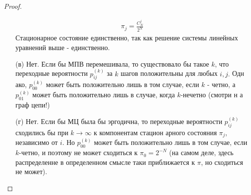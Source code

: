 \begin{proof}
\begin{itemize}
\begin{gather*}
            \pi_{j}=\frac{C_{N}^{j}}{2^{N}}
        \end{gather*}
        Стационарное состояние единственно, так как решение системы линейных уравнений выше - единственно.
    \item[(в)]
        Нет. Если бы МПВ перемешивала, то существовало бы такое $k$, что переходные вероятности $p_{i j}^{(k)}$ за $k$ шагов положительны для любых $i, j .$ Одн ако, $p_{00}^{(k)}$ может быть положительно лишь в том случае, если $k$ - четно, а $p_{01}^{(k)}$ может быть положительно лишь в случае, когда $k$-нечетно (смотри н а граф цепи!)
    \item[(г)]
        Нет. Если бы МЦ была бы эргодична, то переходные вероятности $p_{i j}^{(k)}$ сходились бы при $k \rightarrow \infty$ к компонентам стацион арного состояния $\pi_{j}$, независимо от $i$. Но $p_{00}^{(k)}$ может быть положительно лишь в том случае, если $k$-четно, и поэтому не может сходиться к $\pi_{0}=2^{-N}$ (на самом деле, здесь распределенне в определенном смысле таки приближается к $\pi$, но сходиться не может).
    \end{itemize}
    \end{proof}
\vskip 0.6in


